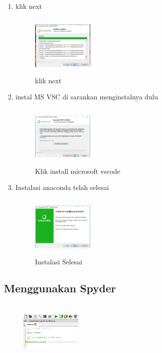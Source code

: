 \begin{enumerate}
    \item klik next
    \begin{figure}[H]
        \centering
        \includegraphics[width=3cm,height=3cm]{figures/oni/8.png}
        \caption{klik next}
        \label{offering}
        \end{figure}

 \item instal MS VSC di sarankan menginstalnya dulu
    \begin{figure}[H]
        \centering
        \includegraphics[width=3cm,height=3cm]{figures/oni/9.png}
        \caption{Klik install microsoft vscode}
        \label{offering}
        \end{figure}

    \item Instalasi anaconda telah selesai
     \begin{figure}[H]
        \centering
        \includegraphics[width=3cm,height=3cm]{figures/oni/10.png}
        \caption{Instalasi Selesai}
        \label{akhir}
        \end{figure}
\end{enumerate}

\subsection{Menggunakan Spyder}

 \begin{figure}[H]
        \centering
        \includegraphics[width=3cm,height=3cm]{figures/oni/oni.png}
        \label{akhir}
        \end{figure}

